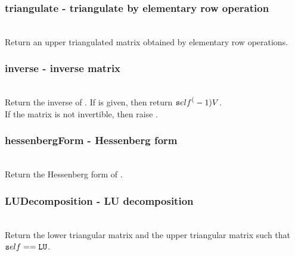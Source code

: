   \subsubsection{triangulate - triangulate by elementary row operation}
   \\
   \spacing
   \quad Return an upper triangulated matrix obtained by elementary row operations.\\
   \spacing
  \subsubsection{inverse - inverse matrix}
   \\
   \spacing
   \quad Return the inverse of .
   If  is given, then return ${\texttt self}^(-1)V$.\\ 
   \spacing
   \quad \negok If the matrix is not invertible, then raise .\\
   \spacing
  \subsubsection{hessenbergForm - Hessenberg form}
   \\
   \spacing
   \quad Return the Hessenberg form of .\\
   \spacing
  \subsubsection{LUDecomposition - LU decomposition}
   \\
   \spacing
   \quad Return the lower triangular matrix  and the upper triangular matrix  such that ${\texttt self} == {\texttt L}{\texttt U}$.\\
   \spacing
\C

